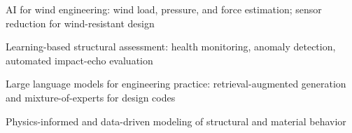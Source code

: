 

\begin{cventries}
  \fontsize{9pt}{\cvgrid}\bodyfont\upshape\color{text}\selectfont
  \begin{cvitems}
    \item {AI for wind engineering: wind load, pressure, and force estimation; sensor reduction for wind-resistant design}
    \item {Learning-based structural assessment: health monitoring, anomaly detection, automated impact-echo evaluation}
    \item {Large language models for engineering practice: retrieval-augmented generation and mixture-of-experts for design codes}
    \item {Physics-informed and data-driven modeling of structural and material behavior}
  \end{cvitems}
\end{cventries}
